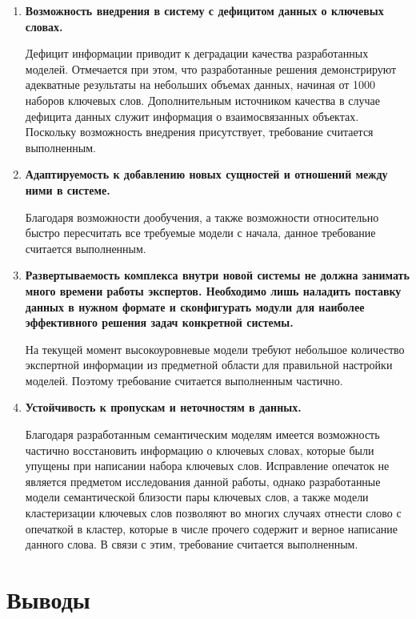 \begin{enumerate}
\begin{enumerate}[label*=\arabic*.]
        \item \textbf{Возможность внедрения в систему с дефицитом данных о ключевых словах.}

            Дефицит информации приводит к деградации качества разработанных моделей. Отмечается при этом, что разработанные решения демонстрируют адекватные результаты на небольших объемах данных, начиная от 1000 наборов ключевых слов. Дополнительным источником качества в случае дефицита данных служит информация о взаимосвязанных объектах. Поскольку возможность внедрения присутствует, требование считается выполненным.

        \item \textbf{Адаптируемость к добавлению новых сущностей и отношений между ними в системе.}

            Благодаря возможности дообучения, а также возможности относительно быстро пересчитать все требуемые модели с начала, данное требование считается выполненным.

        \item \textbf{Развертываемость комплекса внутри новой системы не должна занимать много времени работы экспертов. Необходимо лишь наладить поставку данных в нужном формате и сконфигурать модули для наиболее эффективного решения задач конкретной системы.}

            На текущей момент высокоуровневые модели требуют небольшое количество экспертной информации из предметной области для правильной настройки моделей. Поэтому требование считается выполненным частично.

        \item \textbf{Устойчивость к пропускам и неточностям в данных.}

            Благодаря разработанным семантическим моделям имеется возможность частично восстановить информацию о ключевых словах, которые были упущены при написании набора ключевых слов. Исправление опечаток не является предметом исследования данной работы, однако разработанные модели семантической близости пары ключевых слов, а также модели кластеризации ключевых слов позволяют во многих случаях отнести слово с опечаткой в кластер, которые в числе прочего содержит и верное написание данного слова. В связи с этим, требование считается выполненным.

    \end{enumerate}
\end{enumerate}

\section{Выводы}

